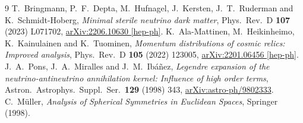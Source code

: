 \documentclass[11pt,a4paper]{article}
\begin{document}
\begin{thebibliography}{9}
T.~Bringmann, P.~F.~Depta, M.~Hufnagel, J.~Kersten, J.~T.~Ruderman and
K.~Schmidt-Hoberg, \emph{Minimal sterile neutrino dark matter},
Phys.\ Rev.\ D \textbf{107} (2023) L071702,
\href{https://arxiv.org/abs/2206.10630}{arXiv:2206.10630 [hep-ph]}.
K.~Ala-Mattinen, M.~Heikinheimo, K.~Kainulainen and K.~Tuominen,
\emph{Momentum distributions of cosmic relics: Improved analysis},
Phys.\ Rev.\ D \textbf{105} (2022) 123005,
\href{https://arxiv.org/abs/2201.06456}{arXiv:2201.06456 [hep-ph]}.
J.~A.~Pons, J.~A.~Miralles and J.~M.~Ib\'a\~nez,
\emph{Legendre expansion of the neutrino-antineutrino annihilation kernel:
Influence of high order terms},
Astron.\ Astrophys.\ Suppl.\ Ser.\ \textbf{129} (1998) 343,
\href{https://arxiv.org/abs/astro-ph/9802333}{arXiv:astro-ph/9802333}.
C.~M\"uller, \emph{Analysis of Spherical Symmetries in Euclidean Spaces},
Springer (1998).
\end{thebibliography}
\end{document}
